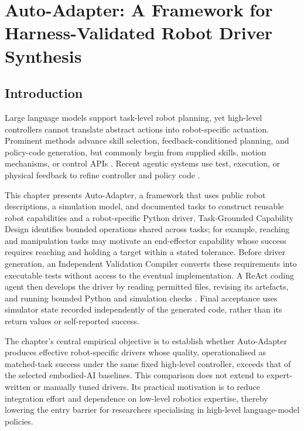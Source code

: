 \chapter[Auto-Adapter Framework]{Auto-Adapter: A Framework for Harness-Validated Robot Driver Synthesis}
\label{chapter:autoadapter-component-analysis}

\section{Introduction}

Large language models support task-level robot planning, yet high-level
controllers cannot translate abstract actions into robot-specific actuation.
Prominent methods advance skill selection, feedback-conditioned planning, and
policy-code generation, but commonly begin from supplied skills, motion
mechanisms, or control APIs
\citep{ahn2022saycan,huang2023innermonologue,liang2023codeaspolicies}. Recent
agentic systems use test, execution, or physical feedback to refine controller
and policy code
\citep{tripathi2026testdriven,xiao2026enpire,fu2026capx,lu2026aspire}.

This chapter presents Auto-Adapter, a framework that uses public robot
descriptions, a simulation model, and documented tasks to construct reusable
robot capabilities and a robot-specific Python driver. Task-Grounded
Capability Design identifies bounded operations shared across tasks; for
example, reaching and manipulation tasks may motivate an end-effector
capability whose success requires reaching and holding a target within a stated
tolerance. Before driver generation, an Independent Validation Compiler
converts these requirements into executable tests without access to the
eventual implementation. A ReAct coding agent then develops the driver by
reading permitted files, revising its artefacts, and running bounded Python and
simulation checks \citep{yao2023react}. Final acceptance uses simulator state
recorded independently of the generated code, rather than its return values or
self-reported success.

The chapter's central empirical objective is to establish whether Auto-Adapter
produces effective robot-specific drivers whose quality, operationalised as
matched-task success under the same fixed high-level controller, exceeds that
of the selected embodied-AI baselines. This comparison does not extend to
expert-written or manually tuned drivers. Its practical motivation is to reduce
integration effort and dependence on low-level robotics expertise, thereby
lowering the entry barrier for researchers specialising in high-level
language-model policies.

